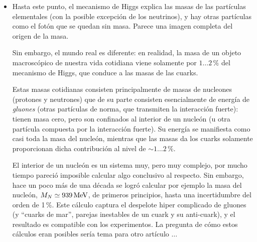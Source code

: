\begin{itemize}
\item Hasta este punto, el mecanismo de Higgs explica las masas
de las part\'iculas elementales (con la posible excepci\'on de
los neutrinos), y hay otras part\'iculas como el fot\'on que se
quedan sin masa. Parece una imagen completa del origen de la masa.

Sin embargo, el mundo real es diferente: en realidad, la masa de un
objeto macrosc\'opico de nuestra vida cotidiana viene solamente
por $1 \dots 2 \, \%$ del mecanismo de Higgs, que conduce a las
masas de las cuarks.

Estas masas cotidianas consisten principalmente de masas de
nucleones (protones y neutrones) que de su parte consisten
esencialmente de energ\'ia de {\em gluones} (otras part\'iculas de
norma, que transmiten la interacci\'on fuerte): tienen masa cero,
pero son confinados al interior de un nucle\'on (u otra part\'icula
compuesta por la interacci\'on fuerte). Su energ\'ia se
manifiesta como casi toda la masa del nucle\'on, mientras que
las masas da los cuarks solamente proporcionan dicha contribuci\'on
al nivel de $\sim 1 \dots 2 \, \%$.

El interior de un nucle\'on es un sistema muy, pero muy complejo,
por mucho tiempo pareci\'o imposible calcular algo conclusivo
al respecto. Sin embargo, hace un poco m\'as de una d\'ecada 
se logr\'o calcular por ejemplo la masa del nucle\'on,
$M_N \simeq 939\,{\rm MeV}$, de primeros principios, hasta una
incertidumbre del orden de 1\,\%. Este c\'alculo captura
el despelote hiper complicado de gluones (y ``cuarks de mar'',
parejas inestables de un cuark y su anti-cuark), y el
resultado es compatible con los experimentos. La pregunta de
c\'omo estos c\'alculos eran posibles ser\'ia tema para otro
art\'iculo $\dots$

\end{itemize}